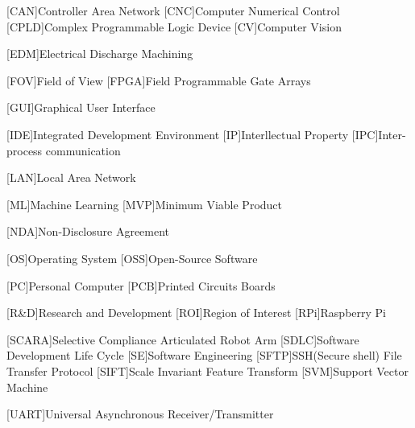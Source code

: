 \begin{acronym}
	[CAN]{Controller Area Network}
	[CNC]{Computer Numerical Control}
	[CPLD]{Complex Programmable Logic Device}
	[CV]{Computer Vision}
	
	[EDM]{Electrical Discharge Machining}
	
	[FOV]{Field of View}
	[FPGA]{Field Programmable Gate Arrays}
	
	[GUI]{Graphical User Interface}
	
	[IDE]{Integrated Development Environment}
	[IP]{Interllectual Property}
	[IPC]{Inter-process communication}
	
	[LAN]{Local Area Network}
	
	[ML]{Machine Learning}
	[MVP]{Minimum Viable Product}
	
	[NDA]{Non-Disclosure Agreement}
	
	[OS]{Operating System}
	[OSS]{Open-Source Software}
	
	[PC]{Personal Computer}
	[PCB]{Printed Circuits Boards}
	
	[R\&D]{Research and Development}
	[ROI]{Region of Interest}
	[RPi]{Raspberry Pi}
			
	[SCARA]{Selective Compliance Articulated Robot Arm}
	[SDLC]{Software Development Life Cycle}
	[SE]{Software Engineering}
	[SFTP]{SSH(Secure shell) File Transfer Protocol}
	[SIFT]{Scale Invariant Feature Transform}
	[SVM]{Support Vector Machine}
	
	[UART]{Universal Asynchronous Receiver/Transmitter}
\end{acronym}

